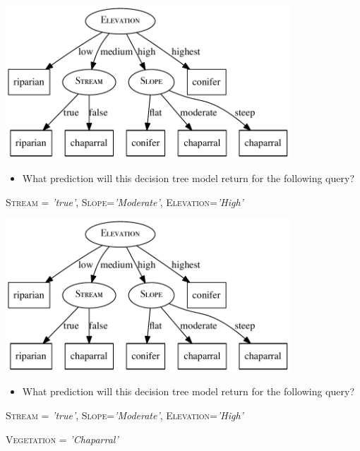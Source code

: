 \documentclass[xcolor={table}]{beamer}
\newcommand{\featN}[1]{\textsc{#1}}
\newcommand{\featL}[1]{\textit{'#1'}}
\begin{document}
\begin{frame}
\centerline{
	\includegraphics[width=0.8\textwidth]{./images/ex-hand-ecology-dectree4_mod.pdf}
}
\begin{itemize}
	\item What prediction will this decision tree model return for the following query?
\end{itemize}
\begin{center}
\featN{Stream} = \featL{true}, \featN{Slope}=\featL{Moderate}, \featN{Elevation}=\featL{High}
\end{center}
\end{frame}

\begin{frame}
\centerline{
	\includegraphics[width=0.8\textwidth]{./images/ex-hand-ecology-dectree4_mod.pdf}
}
\begin{itemize}
	\item What prediction will this decision tree model return for the following query?
\end{itemize}
\begin{center}
\featN{Stream} = \featL{true}, \featN{Slope}=\featL{Moderate}, \featN{Elevation}=\featL{High}
\end{center}
\begin{center}
\alert{\featN{Vegetation} = \featL{Chaparral}}
\end{center}
\end{frame}
\end{document}
